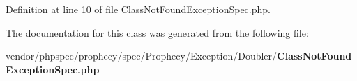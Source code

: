 Definition at line 10 of file Class\+Not\+Found\+Exception\+Spec.\+php.



The documentation for this class was generated from the following file\+:\begin{DoxyCompactItemize}
\item 
vendor/phpspec/prophecy/spec/\+Prophecy/\+Exception/\+Doubler/{\bf Class\+Not\+Found\+Exception\+Spec.\+php}\end{DoxyCompactItemize}
